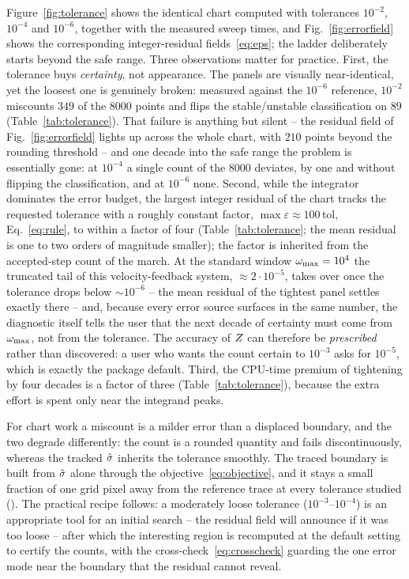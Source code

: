 Figure~\ref{fig:tolerance} shows the identical chart computed with
tolerances $10^{-2}$, $10^{-4}$ and $10^{-6}$, together with the
measured sweep times, and Fig.~\ref{fig:errorfield} shows the corresponding
integer-residual fields~\eqref{eq:eps}; the ladder deliberately starts
beyond the safe range. Three observations matter for practice. First, the
tolerance buys \emph{certainty}, not appearance. The panels are visually
near-identical, yet the loosest one is genuinely broken: measured against
the $10^{-6}$ reference, $10^{-2}$ miscounts $349$ of the $8000$ points and
flips the stable/unstable classification on $89$
(Table~\ref{tab:tolerance}). That failure is anything but silent -- the
residual field of Fig.~\ref{fig:errorfield} lights up across the whole
chart, with $210$ points beyond the rounding threshold -- and one decade
into the safe range the problem is essentially gone: at $10^{-4}$ a single
count of the $8000$ deviates, by one and without flipping the
classification, and at $10^{-6}$ none. Second, while the integrator
dominates the error budget, the largest integer residual of the chart tracks
the requested tolerance with a roughly constant factor,
$\max\varepsilon\approx100\,\mathrm{tol}$, Eq.~\eqref{eq:rule}, to within a factor of four (Table~\ref{tab:tolerance}; the mean residual is
one to two orders of magnitude smaller); the factor is inherited from the
accepted-step count of the march. At the standard window $\omega_{\mathrm{max}}=10^{4}$ the
truncated tail of this velocity-feedback system, $\approx2\cdot10^{-5}$,
takes over once the tolerance drops below $\sim10^{-6}$ -- the mean
residual of the tightest panel settles exactly there -- and, because every
error source surfaces in the same number, the diagnostic itself tells the
user that the next decade of certainty must come from $\omega_{\mathrm{max}}$, not from the
tolerance. The accuracy of $Z$ can therefore be \emph{prescribed}
rather than discovered: a user who wants the count certain to $10^{-3}$
asks for $10^{-5}$, which is exactly the package default. Third, the
CPU-time premium of tightening by four decades is a factor of three
(Table~\ref{tab:tolerance}), because the extra effort is spent only near
the integrand peaks.

For chart work a miscount is a milder error than a displaced boundary, and
the two degrade differently: the count is a rounded quantity and fails
discontinuously, whereas the tracked $\hat{\sigma}$ inherits the tolerance
smoothly. The traced boundary is built from $\hat{\sigma}$ alone through the
objective~\eqref{eq:objective}, and it stays a small fraction of one grid
pixel away from the reference trace at every tolerance studied
(). The practical recipe follows: a
moderately loose tolerance ($10^{-3}$--$10^{-4}$) is an appropriate tool
for an initial search -- the residual field will announce if it was too
loose -- after which the interesting region is recomputed at the default
setting to certify the counts, with the cross-check~\eqref{eq:crosscheck}
guarding the one error mode near the boundary that the residual cannot
reveal.

